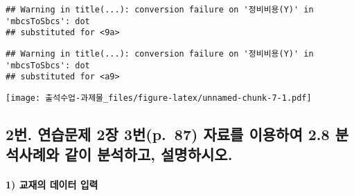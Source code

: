 \documentclass[
]{article}
\newenvironment{Shaded}{\begin{snugshade}}{\end{snugshade}}
\newcommand{\AttributeTok}[1]{\textcolor[rgb]{0.77,0.63,0.00}{#1}}
\newcommand{\DecValTok}[1]{\textcolor[rgb]{0.00,0.00,0.81}{#1}}
\newcommand{\FunctionTok}[1]{\textcolor[rgb]{0.00,0.00,0.00}{#1}}
\newcommand{\NormalTok}[1]{#1}
\newcommand{\SpecialCharTok}[1]{\textcolor[rgb]{0.00,0.00,0.00}{#1}}
\newcommand{\StringTok}[1]{\textcolor[rgb]{0.31,0.60,0.02}{#1}}
\begin{document}
\begin{verbatim}
## Warning in title(...): conversion failure on '정비비용(Y)' in 'mbcsToSbcs': dot
## substituted for <9a>
\end{verbatim}

\begin{verbatim}
## Warning in title(...): conversion failure on '정비비용(Y)' in 'mbcsToSbcs': dot
## substituted for <a9>
\end{verbatim}

\begin{Shaded}
\end{Shaded}

\texttt{[image: 출석수업-과제물\_files/figure-latex/unnamed-chunk-7-1.pdf]}

\hypertarget{uxbc88.-uxc5f0uxc2b5uxbb38uxc81c-2uxc7a5-3uxbc88p.-87-uxc790uxb8ccuxb97c-uxc774uxc6a9uxd558uxc5ec-2.8-uxbd84uxc11duxc0acuxb840uxc640-uxac19uxc774-uxbd84uxc11duxd558uxace0-uxc124uxba85uxd558uxc2dcuxc624.}{%
\subsection{2번. 연습문제 2장 3번(p.~87) 자료를 이용하여 2.8 분석사례와
같이 분석하고,
설명하시오.}\label{uxbc88.-uxc5f0uxc2b5uxbb38uxc81c-2uxc7a5-3uxbc88p.-87-uxc790uxb8ccuxb97c-uxc774uxc6a9uxd558uxc5ec-2.8-uxbd84uxc11duxc0acuxb840uxc640-uxac19uxc774-uxbd84uxc11duxd558uxace0-uxc124uxba85uxd558uxc2dcuxc624.}}

\hypertarget{uxad50uxc7acuxc758-uxb370uxc774uxd130-uxc785uxb825}{%
\paragraph{1) 교재의 데이터
입력}\label{uxad50uxc7acuxc758-uxb370uxc774uxd130-uxc785uxb825}}
\end{document}
